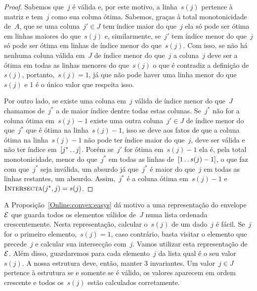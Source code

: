 \begin{proof}
Sabemos que~$j$ é válida e, por este motivo, a linha~$s(j)$ pertence à matriz e tem~$j$ como sua coluna ótima. Sabemos, graças à total monotonicidade de~$A$, que se uma coluna~$j' \in J$ tem índice maior do que~$j$ ela só pode ser ótima em linhas maiores do que~$s(j)$ e, similarmente, se~$j'$ tem índice menor do que~$j$ só pode ser ótima em linhas de índice menor do que~$s(j)$. Com isso, se não há nenhuma coluna válida em~$J$ de índice menor do que~$j$ a coluna~$j$ deve ser a ótima em todas as linhas menores do que~$s(j)$ o que é contradiz a definição de~$s(j)$, portanto,~$s(j) = 1$, já que não pode haver uma linha menor do que~$s(j)$ e 1 é o único valor que respeita isso.

Por outro lado, se existe uma coluna em~$j$ válida de índice menor do que~$J$ chamamos de~$j^*$ a de maior índice dentre todas estas colunas. Se~$j^*$ não for a coluna ótima em~$s(j) - 1$ existe uma outra coluna~$j' \in J$ de índice menor do que~$j^*$ que é ótima na linha~$s(j) - 1$, isso se deve aos fatos de que a coluna ótima na linha~$s(j) - 1$ não pode ter índice maior do que~$j$, deve ser válida e não ter índice em~$[j^* \,.\,.\, j]$. Porém se~$j'$ for ótima em~$s(j) - 1$ ela é, pela total monotonicidade, menor do que~$j^*$ em todas as linhas de~$[1 \,.\,.\, s(j)-1]$, o que faz com que~$j^*$ seja inválida, um absurdo já que~$j^*$ é maior do que~$j$ em todas as linhas restantes, um absurdo. Assim,~$j^*$ é a coluna ótima em~$s(j) - 1$ e~$\textsc{Intersecta}(j^*,j) = s(j)$.
\end{proof}

A Proposição~\ref{Online:convex:easys} dá motivo a uma representação do envelope~$\mathcal{E}$ que guarda todos os elementos válidos de~$J$ numa lista ordenada crescentemente. Nesta representação, calcular o~$s(j)$ de um dado~$j$ é fácil. Se~$j$ for o primeiro elemento,~$s(j) = 1$, caso contrário, basta visitar o elemento que precede~$j$ e calcular sua intersecção com~$j$. Vamos utilizar esta representação de~$\mathcal{E}$. Além disso, guardaremos para cada elemento~$j$ da lista qual é o seu valor~$s(j)$. A nossa estrutura deve, então, manter 3 invariantes. Um valor~$j \in J$ pertence à estrutura se e somente se é válido, os valores aparecem em ordem crescente e todos os~$s(j)$ estão calculados corretamente.

